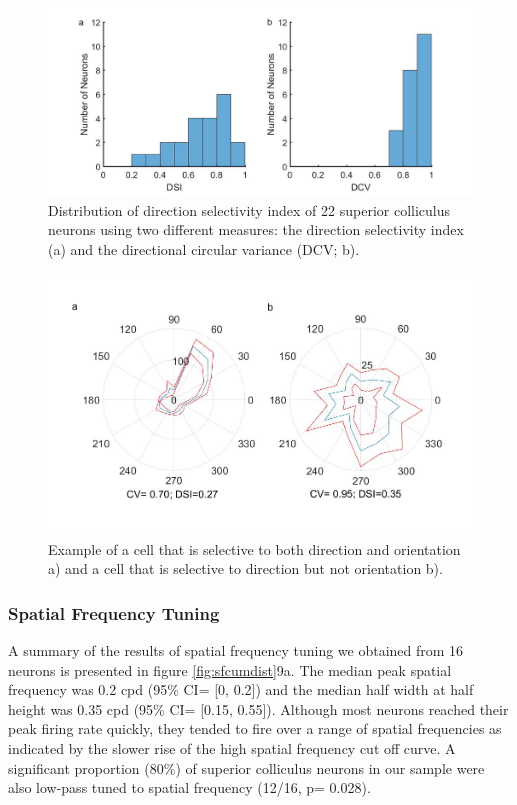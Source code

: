 	\begin{figure}[H]
		\includegraphics[width=\linewidth]{superiorcolliculus/directionselectivity_fig.jpg}
		\caption{Distribution of direction selectivity index of 22 superior colliculus neurons using two different measures: the direction selectivity index (a) and the directional circular variance (DCV; b).}
		\label{fig:ds}			
	\end{figure}
	
	\begin{figure}[H]
		\includegraphics[width=\linewidth]{superiorcolliculus/Directionselectivity.jpg}
		\caption{ Example of a cell that is selective to both direction and orientation a) and a cell that is selective to direction but not orientation b).}
		\label{fig:dseg}			
	\end{figure}
	
	\subsubsection{Spatial Frequency Tuning}
	
	A summary of the results of spatial frequency tuning we obtained from 16 neurons is presented in figure \ref{fig:sfcumdist}9a. The median peak spatial frequency was 0.2 cpd (95\% CI= [0, 0.2]) and the median half width at half height was 0.35 cpd (95\% CI= [0.15, 0.55]). Although most neurons reached their peak firing rate quickly, they tended to fire over a range of spatial frequencies as indicated by the slower rise of the high spatial frequency cut off curve. A significant proportion (80\%) of superior colliculus neurons in our sample were also low-pass tuned to spatial frequency (12/16, p= 0.028).
	

